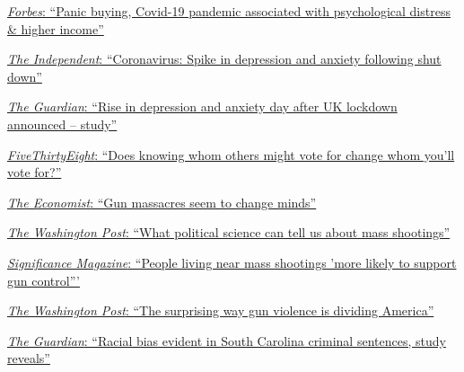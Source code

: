 \documentclass[12pt]{article}
\newcommand{\halfblankline}{\quad\vspace{-0.5\baselineskip}\pagebreak[3]}
\begin{document}
\fontsize{10}{12}\selectfont
\href{https://www.forbes.com/sites/anuradhavaranasi/2021/01/30/panic-buying-during-the-covid-19-pandemic-associated-with-psychological-distress--higher-income-study/?sh=b9cfb7f267a8}{\textit{Forbes}: ``Panic buying, Covid-19 pandemic associated with psychological distress \& higher income''}

\href{https://www.independent.co.uk/life-style/health-and-families/health-news/coronavirus-shutdown-anxiety-depression-spike-study-nhs-doctors-nurses-a9437091.html}{\textit{The Independent}: ``Coronavirus: Spike in depression and anxiety following shut down''}

\href{https://www.theguardian.com/world/2020/mar/31/rise-in-depression-and-anxiety-day-after-uk-lockdown-announced-study-coronavirus}{\textit{The Guardian}: ``Rise in depression and anxiety day after UK lockdown announced – study''}

\href{https://fivethirtyeight.com/features/does-knowing-whom-others-might-vote-for-change-whom-youll-vote-for/}{ \textit{FiveThirtyEight}: ``Does knowing whom others might vote for change whom you'll vote for?''}

\href{https://www.economist.com/united-states/2018/05/26/gun-massacres-seem-to-change-minds}
{ \textit{The Economist}: ``Gun massacres seem to change minds''}

\href{https://www.washingtonpost.com/news/monkey-cage/wp/2017/11/06/what-political-science-can-tell-us-about-mass-shootings/?utm_term=.e8b7d21f0831}
{\textit{The Washington Post}: ``What political science can tell us about mass shootings'' }

\href{https://www.significancemagazine.com/politics/572-gun-laws-and-mass-shootings}
{\textit{Significance Magazine}: ``People living near mass shootings 'more likely to support gun control''' }

\href{https://www.washingtonpost.com/news/wonk/wp/2018/05/31/the-surprising-way-gun-violence-is-dividing-america/?utm_term=.34704aeef51c}
{\textit{The Washington Post}: ``The surprising way gun violence is dividing America''}

\href{https://www.theguardian.com/us-news/2016/feb/29/racial-bias-criminal-sentencing-south-carolina}
{ \textit{The Guardian}: ``Racial bias evident in South Carolina criminal sentences, study reveals''}

\endgroup

\halfblankline
\end{document}
